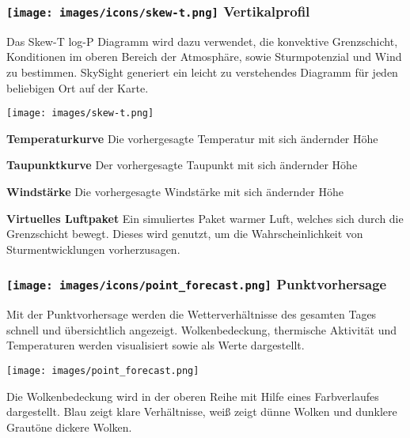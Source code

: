 \documentclass[9pt,a4paper,twocolumn]{article}
\begin{document}
\subsubsection*{\texttt{[image: images/icons/skew-t.png]} Vertikalprofil}
Das Skew-T log-P Diagramm wird dazu verwendet, die konvektive Grenzschicht, Konditionen im oberen Bereich der Atmosphäre, sowie Sturmpotenzial und Wind zu bestimmen. SkySight generiert ein leicht zu verstehendes Diagramm für jeden beliebigen Ort auf der Karte.

\texttt{[image: images/skew-t.png]}

\begin{arrow_red}
\item \textbf{Temperaturkurve} Die vorhergesagte Temperatur mit sich ändernder Höhe 
\end{arrow_red}
\begin{arrow_green}
\item \textbf{Taupunktkurve} Der vorhergesagte Taupunkt mit sich ändernder Höhe
\end{arrow_green}
\begin{arrow_blue}
\item \textbf{Windstärke} Die vorhergesagte Windstärke mit sich ändernder Höhe 
\end{arrow_blue}
\begin{arrow_pink}
\item \textbf{Virtuelles Luftpaket} Ein simuliertes Paket warmer Luft, welches sich durch die Grenzschicht bewegt. Dieses wird genutzt, um die Wahrscheinlichkeit von Sturmentwicklungen vorherzusagen. 
\end{arrow_pink}
\subsubsection*{\texttt{[image: images/icons/point\_forecast.png]} Punktvorhersage}

Mit der Punktvorhersage werden die Wetterverhältnisse des gesamten Tages schnell und übersichtlich angezeigt. Wolkenbedeckung, thermische Aktivität und Temperaturen werden visualisiert sowie als Werte dargestellt.



\texttt{[image: images/point\_forecast.png]}

Die Wolkenbedeckung wird in der oberen Reihe mit Hilfe eines Farbverlaufes dargestellt. Blau zeigt klare Verhältnisse, weiß zeigt dünne Wolken und dunklere Grautöne dickere Wolken.
\end{document}
